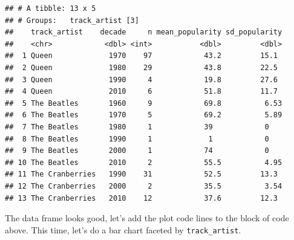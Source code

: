 \documentclass[
]{book}
\newenvironment{Shaded}{\begin{snugshade}}{\end{snugshade}}
\newcommand{\DataTypeTok}[1]{\textcolor[rgb]{0.13,0.29,0.53}{#1}}
\newcommand{\DecValTok}[1]{\textcolor[rgb]{0.00,0.00,0.81}{#1}}
\newcommand{\KeywordTok}[1]{\textcolor[rgb]{0.13,0.29,0.53}{\textbf{#1}}}
\newcommand{\NormalTok}[1]{#1}
\newcommand{\OperatorTok}[1]{\textcolor[rgb]{0.81,0.36,0.00}{\textbf{#1}}}
\newcommand{\StringTok}[1]{\textcolor[rgb]{0.31,0.60,0.02}{#1}}
\begin{document}
\begin{verbatim}
## # A tibble: 13 x 5
## # Groups:   track_artist [3]
##    track_artist    decade     n mean_popularity sd_popularity
##    <chr>            <dbl> <int>           <dbl>         <dbl>
##  1 Queen             1970    97            43.2         15.1 
##  2 Queen             1980    29            43.8         22.5 
##  3 Queen             1990     4            19.8         27.6 
##  4 Queen             2010     6            51.8         11.7 
##  5 The Beatles       1960     9            69.8          6.53
##  6 The Beatles       1970     5            69.2          5.89
##  7 The Beatles       1980     1            39            0   
##  8 The Beatles       1990     1             1            0   
##  9 The Beatles       2000     1            74            0   
## 10 The Beatles       2010     2            55.5          4.95
## 11 The Cranberries   1990    31            52.5         13.3 
## 12 The Cranberries   2000     2            35.5          3.54
## 13 The Cranberries   2010    12            37.6         12.3
\end{verbatim}

The data frame looks good, let's add the plot code lines to the block of code above. This time, let's do a bar chart faceted by \texttt{track\_artist}.

\begin{Shaded}
\end{Shaded}
\end{document}
